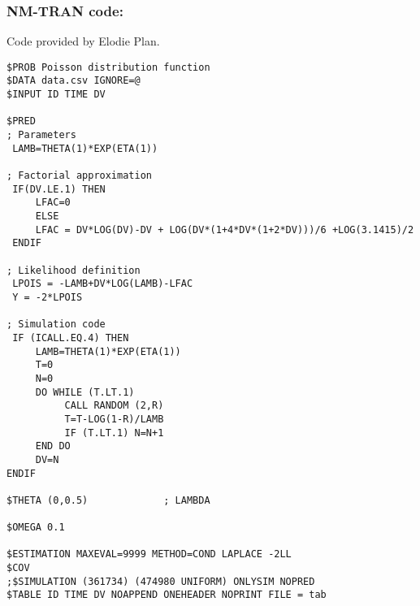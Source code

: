 


\subsubsection{NM-TRAN code:}
Code provided by Elodie Plan.

\myStartLine

\lstset{language=NONMEMdataSet}
\begin{lstlisting}
$PROB Poisson distribution function 
$DATA data.csv IGNORE=@ 
$INPUT ID TIME DV

$PRED 
; Parameters
 LAMB=THETA(1)*EXP(ETA(1))

; Factorial approximation 
 IF(DV.LE.1) THEN
     LFAC=0 
     ELSE 
     LFAC = DV*LOG(DV)-DV + LOG(DV*(1+4*DV*(1+2*DV)))/6 +LOG(3.1415)/2
 ENDIF

; Likelihood definition  
 LPOIS = -LAMB+DV*LOG(LAMB)-LFAC 
 Y = -2*LPOIS

; Simulation code 
 IF (ICALL.EQ.4) THEN
     LAMB=THETA(1)*EXP(ETA(1)) 
     T=0 
     N=0 
     DO WHILE (T.LT.1)
          CALL RANDOM (2,R) 
          T=T-LOG(1-R)/LAMB 
          IF (T.LT.1) N=N+1
     END DO
     DV=N 
ENDIF

$THETA (0,0.5)             ; LAMBDA

$OMEGA 0.1

$ESTIMATION MAXEVAL=9999 METHOD=COND LAPLACE -2LL 
$COV 
;$SIMULATION (361734) (474980 UNIFORM) ONLYSIM NOPRED 
$TABLE ID TIME DV NOAPPEND ONEHEADER NOPRINT FILE = tab
\end{lstlisting}

